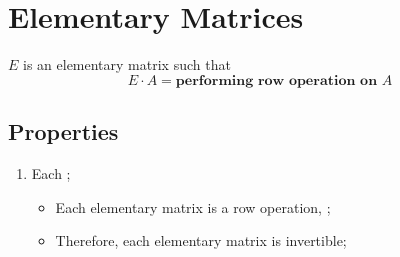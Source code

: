 \section{Elementary Matrices}

\begin{definition}
  $ E $ is an elementary matrix such that 
  \begin{displaymath}
    E \cdot A = \textbf{performing row operation on } A
  \end{displaymath}
\end{definition}

\subsection{Properties}

  \begin{enumerate}
    \item Each ;
    \begin{itemize}
      \item Each elementary matrix is a row operation, 
      ;
      \item Therefore, each elementary matrix is invertible;
    \end{itemize}
  \end{enumerate}
  